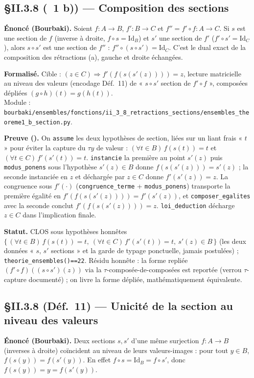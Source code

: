 \subsection{§II.3.8 (\theoreme~1 b)) --- Composition des sections}
\textbf{Énoncé (Bourbaki).} Soient $f : A \to B$, $f' : B \to C$ et $f'' = f' \circ f : A \to C$. Si $s$ est une section de $f$ (inverse à droite, $f \circ s = \mathrm{Id}_B$) et $s'$ une section de $f'$ ($f' \circ s' = \mathrm{Id}_C$), alors $s \circ s'$ est une section de $f''$ : $f'' \circ (s \circ s') = \mathrm{Id}_C$. C'est le dual exact de la composition des rétractions (a), gauche et droite échangées.

\textbf{Formalisé.} Cible : $(z \in C) \Rightarrow f'(f(s(s'(z)))) = z$, lecture matricielle au niveau des valeurs (encodage Déf.~11) de « $s \circ s'$ section de $f' \circ f$ », composées dépliées $(g \circ h)(t) = g(h(t))$. \\
Module : \texttt{bourbaki/ensembles/fonctions/ii\_3\_8\_retractions\_sections/ensembles\_theoreme1\_b\_section.py}.

\textbf{Preuve (\Nstar).} On \texttt{assume} les deux hypothèses de section, liées sur un liant frais « $t$ » pour éviter la capture du $\tau y$ de valeur : $(\forall t\in B)\,f(s(t))=t$ et $(\forall t\in C)\,f'(s'(t))=t$. \texttt{instancie} la première au point $s'(z)$ puis \texttt{modus\_ponens} sous l'hypothèse $s'(z)\in B$ donne $f(s(s'(z)))=s'(z)$ ; la seconde instanciée en $z$ et déchargée par $z\in C$ donne $f'(s'(z))=z$. La congruence sous $f'(\cdot)$ (\texttt{congruence\_terme} + \texttt{modus\_ponens}) transporte la première égalité en $f'(f(s(s'(z))))=f'(s'(z))$, et \texttt{composer\_egalites} avec la seconde conclut $f'(f(s(s'(z))))=z$. \texttt{loi\_deduction} décharge $z\in C$ dans l'implication finale.

\textbf{Statut.} CLOS sous hypothèses honnêtes $\{\,(\forall t\in B)\,f(s(t))=t,\ (\forall t\in C)\,f'(s'(t))=t,\ s'(z)\in B\,\}$ (les deux données « $s$, $s'$ sections » et la garde de typage ponctuelle, jamais postulées) ; \texttt{theorie\_ensembles()==22}. Résidu honnête : la forme repliée $(f'\circ f)((s\circ s')(z))$ via la $\tau$-composée-de-composées est reportée (verrou $\tau$-capture documenté) ; on livre la forme dépliée, mathématiquement équivalente.

\subsection{§II.3.8 (Déf.~11) --- Unicité de la section au niveau des valeurs}
\textbf{Énoncé (Bourbaki).} Deux sections $s, s'$ d'une même surjection $f : A \to B$ (inverses à droite) coïncident au niveau de leurs valeurs-images : pour tout $y \in B$, $f(s(y)) = f(s'(y))$. En effet $f \circ s = \mathrm{Id}_B = f \circ s'$, donc $f(s(y)) = y = f(s'(y))$.

